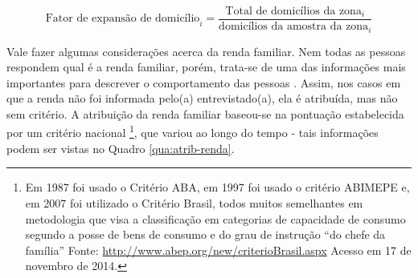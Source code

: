 \begin{equation}\label{eq:fator-expansao-dom}
\mbox{Fator de expansão de domicílio}_i = \frac{\mbox{Total de domicílios da zona}_i}{\mbox{domicílios da amostra da zona}_i}
\end{equation}





Vale fazer algumas considerações acerca da renda familiar. Nem todas as pessoas respondem qual é a renda familiar, porém, trata-se de uma das informações mais importantes para descrever o comportamento das pessoas \cite{SHEARMUR2006}. 
Assim, nos casos em que a renda não foi informada pelo(a) entrevistado(a), ela é atribuída, mas não sem critério. A atribuição da renda familiar baseou-se na pontuação estabelecida por um critério nacional%
\footnote{Em 1987 foi usado o Critério ABA, em 1997 foi usado o critério ABIMEPE e, em 2007 foi utilizado o Critério Brasil, todos muitos semelhantes em metodologia que visa a classificação em categorias de capacidade de consumo segundo a posse de bens de consumo e do grau de instrução ``do chefe da família''
Fonte: \url{http://www.abep.org/new/criterioBrasil.aspx} Acesso em 17 de novembro de 2014.},
que variou ao longo do tempo - tais informações podem ser vistas no Quadro \ref{qua:atrib-renda}.

